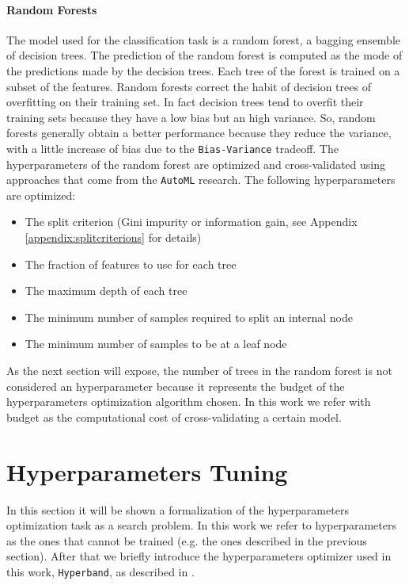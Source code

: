 \documentclass[11pt, a4paper]{article}
\begin{document}
  \paragraph{Random Forests}
    The model used for the classification task is a random forest, a bagging ensemble of decision trees. The prediction of the random forest is computed as the mode of the predictions made by the decision trees. Each tree of the forest is trained on a subset of the features. Random forests correct the habit of decision trees of overfitting on their training set. In fact decision trees tend to overfit their training sets because they have a low bias but an high variance. So, random forests generally obtain a better performance because they reduce the variance, with a little increase of bias due to the \texttt{Bias-Variance} tradeoff. The hyperparameters of the random forest are optimized and cross-validated using approaches that come from the \texttt{AutoML} research. The following hyperparameters are optimized:
    \begin{itemize}
      \item The split criterion (Gini impurity or information gain, see Appendix \ref{appendix:splitcriterions} for details)
      \item The fraction of features to use for each tree
      \item The maximum depth of each tree
      \item The minimum number of samples required to split an internal node
      \item The minimum number of samples to be at a leaf node
    \end{itemize}
  As the next section will expose, the number of trees in the random forest is not considered an hyperparameter because it represents the budget of the hyperparameters optimization algorithm chosen. In this work we refer with budget as the computational cost of cross-validating a certain model.

\section{Hyperparameters Tuning}
  In this section it will be shown a formalization of the hyperparameters optimization task as a search problem. In this work we refer to hyperparameters as the ones that cannot be trained (e.g. the ones described in the previous section). After that we briefly introduce the hyperparameters optimizer used in this work, \texttt{Hyperband}, as described in \cite{hyperband}.
\end{document}
